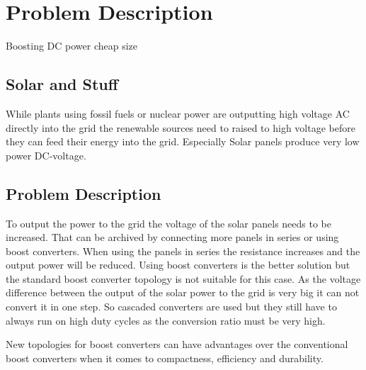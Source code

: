 \chapter{Problem Description}\label{ch:probdesc}
Boosting DC power
cheap
size

\section{Solar and Stuff}
While plants using fossil fuels or nuclear power are outputting high voltage AC directly into the grid the renewable sources need to raised to high voltage before they can feed their energy into the grid.
Especially Solar panels produce very low power DC-voltage.
%

\section{Problem Description}
To output the power to the grid the voltage of the solar panels needs to be increased.
That can be archived by connecting more panels in series or using boost converters.
When using the panels in series the resistance increases and the output power will be reduced.
Using boost converters is the better solution but the standard boost converter topology is not suitable for this case.
As the voltage difference between the output of the solar power to the grid is very big it can not convert it in one step.
So cascaded converters are used but they still have to always run on high duty cycles as the conversion ratio must be very high. 

New topologies for boost converters can have advantages over the conventional boost converters when it comes to compactness, efficiency and durability.